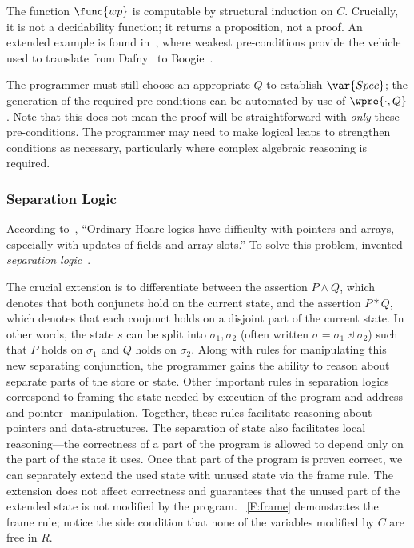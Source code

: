 The function \(\func{wp}\) is computable by structural induction on
\(C\). Crucially, it is not a decidability function; it returns a proposition,
not a proof. An extended example is found in~\cite[\S 3]{leino2008specification},
where weakest pre-conditions provide the vehicle used to translate from
Dafny~\cite{leino2010dafny} to Boogie~\cite{Barnett_2006,leino2008this}.

The programmer must still choose an appropriate \(Q\) to establish
\(\var{Spec}\); the generation of the required pre-conditions can be automated
by use of \(\wpre{\cdot,Q}\). Note that this does not mean the proof will be
straightforward with \emph{only} these pre-conditions. The programmer may need
to make logical leaps to strengthen conditions as necessary, particularly where
complex algebraic reasoning is required.

\subsubsection{Separation Logic}

According to~\cite[\S 5]{Appel_2011}, ``Ordinary Hoare logics have difficulty
with pointers and arrays, especially with updates of fields and array slots.''
To solve this problem, \citeauthor{Reynolds} invented \emph{separation
logic}~\cite{Reynolds}.

The crucial extension is to differentiate between the assertion \(P \land Q\),
which denotes that both conjuncts hold on the current state, and the assertion
\(P * Q\), which denotes that each conjunct holds on a disjoint part of the
current state. In other words, the state \(s\) can be split into \(\sigma_1,
\sigma_2\) (often written \(\sigma = \sigma_1 \uplus \sigma_2\)) such that \(P\)
holds on \(\sigma_1\) and \(Q\) holds on \(\sigma_2\). Along with rules for
manipulating this new separating conjunction, the programmer gains the ability
to reason about separate parts of the store or state. Other important rules in
separation logics correspond to framing the state needed by execution of the
program and address- and pointer- manipulation. Together, these rules facilitate
reasoning about pointers and data-structures. The separation of state also
facilitates local reasoning---the correctness of a part of the program is
allowed to depend only on the part of the state it uses. Once that part of the
program is proven correct, we can separately extend the used state with unused
state via the frame rule. The extension does not affect correctness and
guarantees that the unused part of the extended state is not modified by the
program. \figurename~\ref{F:frame} demonstrates the frame rule; notice the side
condition that none of the variables modified by \(C\) are free in \(R\).

